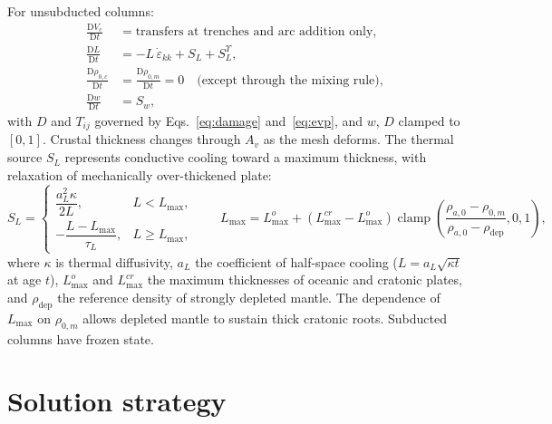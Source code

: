 \documentclass[11pt]{article}
\begin{document}
For unsubducted columns:
\begin{align}
  \frac{\mathrm{D}V_c}{\mathrm{D}t} &= \text{transfers at trenches and arc addition only},\\
  \frac{\mathrm{D}L}{\mathrm{D}t} &= -L\,\dot\varepsilon_{kk} + S_L + S_L^{\Upsilon},\\
  \frac{\mathrm{D}\rho_{0,c}}{\mathrm{D}t} &= \frac{\mathrm{D}\rho_{0,m}}{\mathrm{D}t} = 0
  \quad\text{(except through the mixing rule)},\\
  \frac{\mathrm{D}w}{\mathrm{D}t} &= S_w,
\end{align}
with $D$ and $T_{ij}$ governed by Eqs.~\eqref{eq:damage} and~\eqref{eq:evp}, and
$w$, $D$ clamped to $[0,1]$. Crustal thickness changes through $A_v$ as the mesh
deforms. The thermal source $S_L$ represents conductive cooling toward a
maximum thickness, with relaxation of mechanically over-thickened plate:
\begin{equation}
  S_L =
  \begin{cases}
    \dfrac{a_L^2\kappa}{2L}, & L < L_{\max},\\[2ex]
    -\dfrac{L - L_{\max}}{\tau_L}, & L \ge L_{\max},
  \end{cases}
  \qquad
  L_{\max} = L_{\max}^{o} + \left(L_{\max}^{cr}-L_{\max}^{o}\right)
  \operatorname{clamp}\!\left(\frac{\rho_{a,0}-\rho_{0,m}}{\rho_{a,0}-\rho_{\mathrm{dep}}},0,1\right),
\end{equation}
where $\kappa$ is thermal diffusivity, $a_L$ the coefficient of half-space
cooling ($L = a_L\sqrt{\kappa t}$ at age $t$), $L_{\max}^{o}$ and
$L_{\max}^{cr}$ the maximum thicknesses of oceanic and cratonic plates, and
$\rho_{\mathrm{dep}}$ the reference density of strongly depleted mantle. The
dependence of $L_{\max}$ on $\rho_{0,m}$ allows depleted mantle to sustain thick
cratonic roots. Subducted columns have frozen state.

\section{Solution strategy}
\label{sec:solution}
\end{document}
